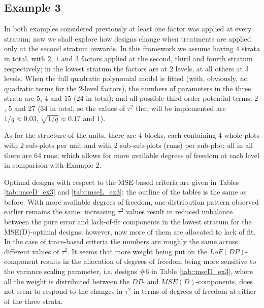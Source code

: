 \subsection{Example 3}
In both examples considered previously at least one factor was applied at every stratum; now we shall explore how designs change when treatments are applied only at the second stratum onwards. In this framework we assume having $4$ strata in total, with $2$, $1$ and $3$ factors applied at the second, third and fourth stratum respectively; in the lowest stratum the factors are at $2$ levels, at all others at $3$ levels. When the full quadratic polynomial model is fitted (with, obviously, no quadratic terms for the $2$-level factors), the numbers of parameters in the three strata are $5$, $4$ and $15$ ($24$ in total); and all possible third-order potential terms: $2$, $5$ and $27$ ($34$ in total, so the values of $\tau^2$ that will be implemented are $1/q\approx 0.03$, $\sqrt{1/q}\approx 0.17$ and $1$).

As for the structure of the units, there are $4$ blocks, each containing $4$ whole-plots with $2$ sub-plots per unit and with $2$ sub-sub-plots (runs) per sub-plot; all in all there are $64$ runs, which allows for more available degrees of freedom at each level in comparison with Example $2$.

Optimal designs with respect to the MSE-based criteria are given in Tables \ref{tab::mseD_ex3} and \ref{tab::mseL_ex3}; the outline of the tables is the same as before. With more available degrees of freedom, one distribution pattern observed earlier remains the same: increasing $\tau^2$ values result in reduced imbalance between the pure error and lack-of-fit components in the lowest stratum for the MSE(D)-optimal designs; however, now more of them are allocated to lack of fit. In the case of trace-based criteria the numbers are roughly the same across different values of $\tau^2$. It seems that more weight being put on the $LoF(DP)$-component results in the allocation of degrees of freedom being more sensitive to the variance scaling parameter, i.e. designs \#$6$ in Table \ref{tab::mseD_ex3}, where all the weight is distributed between the $DP$- and $MSE(D)$-components, does not seem to respond to the changes in $\tau^2$ in terms of degrees of freedom at either of the three strata.

